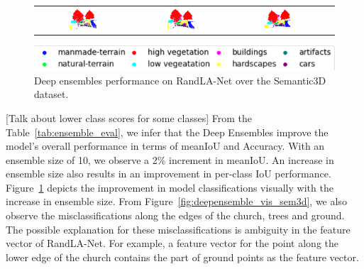 \begin{figure}[h!]
\begin{tabular}{cccc}
            \includegraphics[width=0.30\textwidth, height=0.15\textheight]{images/seg_output/deep_ensembles/2_1.pdf} &
            \includegraphics[width=0.30\textwidth, height=0.15\textheight]{images/seg_output/deep_ensembles/2_5.pdf}& 
            \includegraphics[width=0.30\textwidth, height=0.15\textheight]{images/seg_output/deep_ensembles/2_10.pdf}\\
        \end{tabular}
        \includegraphics[scale=0.65]{images/legend.png}
        \caption{Deep ensembles performance on RandLA-Net over the Semantic3D dataset.}
        \label{fig:deepensemble_improv}
    \end{figure}

    [Talk about lower class scores for some classes]
    From the Table~\ref{tab:ensemble_eval}, we infer that the Deep Ensembles improve the model's overall performance in terms of meanIoU and Accuracy.
    With an ensemble size of 10, we observe a 2\% increment in meanIoU.
    An increase in ensemble size also results in an improvement in per-class IoU performance.
    Figure~\ref{fig:deepensemble_improv} depicts the improvement in model classifications visually with the increase in ensemble size.
    From Figure~\ref{fig:deepensemble_vis_sem3d}, we also observe the misclassifications along the edges of the church, trees and ground.
    The possible explanation for these misclassifications is ambiguity in the feature vector of RandLA-Net. For example, a feature vector for the point along the lower edge of the church contains the part of ground points as the feature vector.
